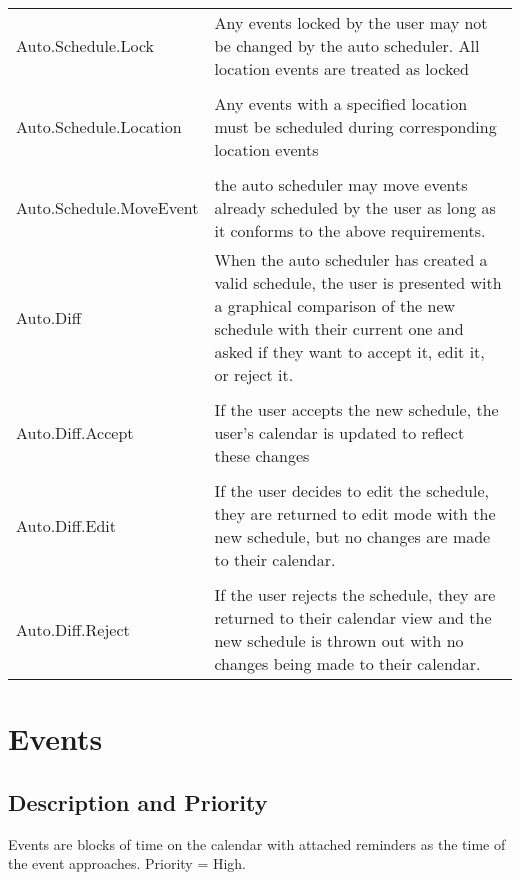 \documentclass{scrreprt}
\begin{document}
\begin{center}
\begin{longtable}{ | p{6cm} | p{9cm} | }
Auto.Schedule.Lock & Any events locked by the user may not be changed by the
auto scheduler.  All location events are treated as locked\\
& \\
Auto.Schedule.Location & Any events with a specified location must be scheduled
during corresponding location events\\
& \\
Auto.Schedule.MoveEvent & the auto scheduler may move events already scheduled by
the user as long as it conforms to the above requirements.\\
\hline
Auto.Diff & When the auto scheduler has created a valid schedule, the user is
presented with a graphical comparison of the new schedule with their current one
and asked if they want to accept it, edit it, or reject it.\\
& \\
Auto.Diff.Accept & If the user accepts the new schedule, the user's calendar is
updated to reflect these changes\\
& \\
Auto.Diff.Edit & If the user decides to edit the schedule, they are returned to
edit mode with the new schedule, but no changes are made to their calendar.\\
& \\
Auto.Diff.Reject & If the user rejects the schedule, they are returned to their
calendar view and the new schedule is thrown out with no changes being made to
their calendar.\\
\hline
\end{longtable}
\end{center}

\section{Events}

\subsection{Description and Priority}
Events are blocks of time on the calendar with attached reminders as the time of the event approaches. Priority = High.
\end{document}
